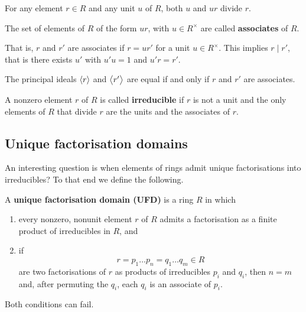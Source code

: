 For any element $ r \in R $ and any unit $ u $ of $ R $, both $ u $ and $ ur $ divide $ r $.

\begin{definition}
The set of elements of $ R $ of the form $ ur $, with $ u \in R^\times $ are called \textbf{associates} of $ R $.
\end{definition}

That is, $ r $ and $ r' $ are associates if $ r = ur' $ for a unit $ u \in R^\times $. This implies $ r \mid r' $, that is there exists $ u' $ with $ u'u = 1 $ and $ u'r = r' $.

\begin{note*}
The principal ideals $ \left\langle r \right\rangle $ and $ \left\langle r' \right\rangle $ are equal if and only if $ r $ and $ r' $ are associates.
\end{note*}

\begin{definition}
A nonzero element $ r $ of $ R $ is called \textbf{irreducible} if $ r $ is not a unit and the only elements of $ R $ that divide $ r $ are the units and the associates of $ r $.
\end{definition}

\subsection{Unique factorisation domains}

An interesting question is when elements of rings admit unique factorisations into irreducibles? To that end we define the following.

\begin{definition}
A \textbf{unique factorisation domain (UFD)} is a ring $ R $ in which
\begin{enumerate}
\item every nonzero, nonunit element $ r $ of $ R $ admits a factorisation as a finite product of irreducibles in $ R $, and
\item if
$$ r = p_1 \dots p_n = q_1 \dots q_m \in R $$
are two factorisations of $ r $ as products of irreducibles $ p_i $ and $ q_i $, then $ n = m $ and, after permuting the $ q_i $, each $ q_i $ is an associate of $ p_i $.
\end{enumerate}
\end{definition}

Both conditions can fail.

